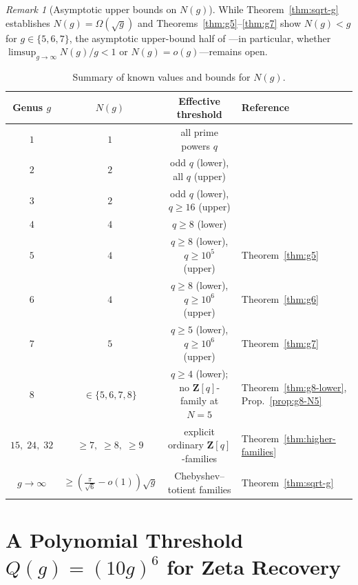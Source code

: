 \documentclass[11pt]{amsart}
\theoremstyle{remark}
\newtheorem{remark}[theorem]{Remark}
\newcommand{\Z}{\mathbf{Z}}
\begin{document}
\begin{remark}[Asymptotic upper bounds on $N(g)$]\label{rem:Ng-upper}
While Theorem~\ref{thm:sqrt-g} establishes $N(g) = \Omega(\sqrt{g})$ and Theorems~\ref{thm:g5}--\ref{thm:g7} show $N(g) < g$ for $g \in \{5, 6, 7\}$, the asymptotic upper-bound half of \cite[Question~7.9]{CK26}---in particular, whether $\limsup_{g \to \infty} N(g)/g < 1$ or $N(g) = o(g)$---remains open.
\end{remark}

\begin{table}[ht]
\centering
\caption{Summary of known values and bounds for $N(g)$.}\label{tab:Ng}
\begin{tabular}{@{}cccl@{}}
\toprule
Genus $g$ & $N(g)$ & Effective threshold & Reference \\
\midrule
$1$ & $1$ & all prime powers $q$ & \cite[Section~7]{CK26} \\
$2$ & $2$ & odd $q$ (lower), all $q$ (upper) & \cite[Section~7]{CK26} \\
$3$ & $2$ & odd $q$ (lower), $q \ge 16$ (upper) & \cite[Section~7]{CK26} \\
$4$ & $4$ & $q \ge 8$ (lower) & \cite[Section~7]{CK26} \\
$5$ & $4$ & $q \ge 8$ (lower), $q \ge 10^5$ (upper) & Theorem~\ref{thm:g5} \\
$6$ & $4$ & $q \ge 8$ (lower), $q \ge 10^6$ (upper) & Theorem~\ref{thm:g6} \\
$7$ & $5$ & $q \ge 5$ (lower), $q \ge 10^6$ (upper) & Theorem~\ref{thm:g7} \\
$8$ & $\in \{5, 6, 7, 8\}$ & $q \ge 4$ (lower); no $\Z[q]$-family at $N = 5$ & Theorem~\ref{thm:g8-lower}, Prop.~\ref{prop:g8-N5} \\
$15,\; 24,\; 32$ & $\ge 7,\; \ge 8,\; \ge 9$ & explicit ordinary $\Z[q]$-families & Theorem~\ref{thm:higher-families} \\
$g \to \infty$ & $\ge (\frac{\pi}{\sqrt{6}} - o(1))\sqrt{g}$ & Chebyshev--totient families & Theorem~\ref{thm:sqrt-g} \\
\bottomrule
\end{tabular}
\end{table}

\section{A Polynomial Threshold \texorpdfstring{$Q(g) = (10g)^6$}{Q(g) = (10g)\^6} for Zeta Recovery}\label{sec:poly-Qg}
\end{document}
